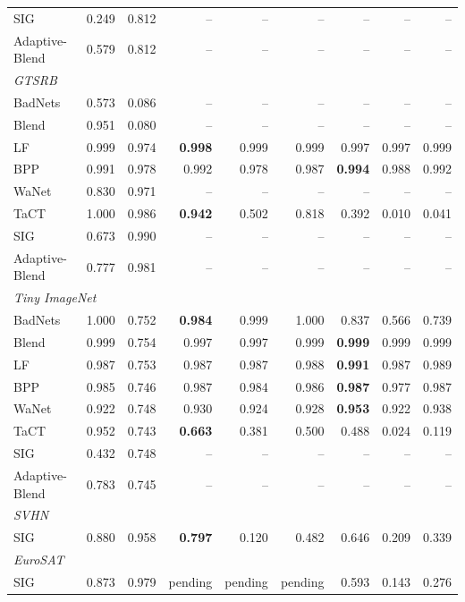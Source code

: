 \begin{table}[htbp]
\begin{tabular}{lrrrrrrrr}
SIG & 0.249 & 0.812 & -- & -- & -- & -- & -- & -- \\
Adaptive-Blend & 0.579 & 0.812 & -- & -- & -- & -- & -- & -- \\
\midrule
\multicolumn{9}{l}{\textit{GTSRB}} \\
BadNets & 0.573 & 0.086 & -- & -- & -- & -- & -- & -- \\
Blend & 0.951 & 0.080 & -- & -- & -- & -- & -- & -- \\
LF & 0.999 & 0.974 & \textbf{0.998} & 0.999 & 0.999 & 0.997 & 0.997 & 0.999 \\
BPP & 0.991 & 0.978 & 0.992 & 0.978 & 0.987 & \textbf{0.994} & 0.988 & 0.992 \\
WaNet & 0.830 & 0.971 & -- & -- & -- & -- & -- & -- \\
TaCT & 1.000 & 0.986 & \textbf{0.942} & 0.502 & 0.818 & 0.392 & 0.010 & 0.041 \\
SIG & 0.673 & 0.990 & -- & -- & -- & -- & -- & -- \\
Adaptive-Blend & 0.777 & 0.981 & -- & -- & -- & -- & -- & -- \\
\midrule
\multicolumn{9}{l}{\textit{Tiny ImageNet}} \\
BadNets & 1.000 & 0.752 & \textbf{0.984} & 0.999 & 1.000 & 0.837 & 0.566 & 0.739 \\
Blend & 0.999 & 0.754 & 0.997 & 0.997 & 0.999 & \textbf{0.999} & 0.999 & 0.999 \\
LF & 0.987 & 0.753 & 0.987 & 0.987 & 0.988 & \textbf{0.991} & 0.987 & 0.989 \\
BPP & 0.985 & 0.746 & 0.987 & 0.984 & 0.986 & \textbf{0.987} & 0.977 & 0.987 \\
WaNet & 0.922 & 0.748 & 0.930 & 0.924 & 0.928 & \textbf{0.953} & 0.922 & 0.938 \\
TaCT & 0.952 & 0.743 & \textbf{0.663} & 0.381 & 0.500 & 0.488 & 0.024 & 0.119 \\
SIG & 0.432 & 0.748 & -- & -- & -- & -- & -- & -- \\
Adaptive-Blend & 0.783 & 0.745 & -- & -- & -- & -- & -- & -- \\
\midrule
\multicolumn{9}{l}{\textit{SVHN}} \\
SIG & 0.880 & 0.958 & \textbf{0.797} & 0.120 & 0.482 & 0.646 & 0.209 & 0.339 \\
\midrule
\multicolumn{9}{l}{\textit{EuroSAT}} \\
SIG & 0.873 & 0.979 & pending & pending & pending & 0.593 & 0.143 & 0.276 \\
\bottomrule
\end{tabular}
\end{table}
